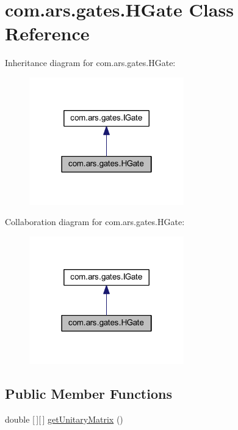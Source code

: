 \hypertarget{classcom_1_1ars_1_1gates_1_1_h_gate}{}\section{com.\+ars.\+gates.\+H\+Gate Class Reference}
\label{classcom_1_1ars_1_1gates_1_1_h_gate}


Inheritance diagram for com.\+ars.\+gates.\+H\+Gate\+:\nopagebreak
\begin{figure}[H]
\begin{center}
\leavevmode
\includegraphics[width=190pt]{classcom_1_1ars_1_1gates_1_1_h_gate__inherit__graph}
\end{center}
\end{figure}


Collaboration diagram for com.\+ars.\+gates.\+H\+Gate\+:\nopagebreak
\begin{figure}[H]
\begin{center}
\leavevmode
\includegraphics[width=190pt]{classcom_1_1ars_1_1gates_1_1_h_gate__coll__graph}
\end{center}
\end{figure}
\subsection*{Public Member Functions}
\begin{DoxyCompactItemize}
\item 
double \mbox{[}$\,$\mbox{]}\mbox{[}$\,$\mbox{]} \hyperlink{classcom_1_1ars_1_1gates_1_1_h_gate_a4749feb03fafcda241d9f854ef43a0d9}{get\+Unitary\+Matrix} ()
\end{DoxyCompactItemize}



